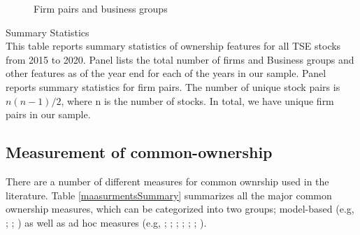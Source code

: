 	\captionsetup[subfigure]{labelformat=parens,font=footnotesize}
			\renewcommand{\thesubfigure}{\Alph{subfigure}}	
	\begin{figure}[htbp]
		\centering
		\caption{ Firm pairs and business groups}
		\label{g2-1}
		\normalcolor
	\bigskip
	
		
	\end{figure}  
	
	
	\captionsetup[subfigure]{labelformat=empty}
	
\DeclareRobustCommand{\myname}{}


	
				
		\captionsetup[subtable]{labelformat=parens}
			\renewcommand{\thesubtable}{\Alph{subtable}}
			 \begin{table}[htbp]
			 \caption{ Summary Statistics \\ \small
			 This table reports summary statistics of ownership features for all TSE stocks from 2015 to 2020. Panel  lists the total number of firms and Business groups and other features as of the year end for each of the years in our sample. Panel  reports summary statistics for firm pairs. The number of unique stock pairs is $ n(n-1)/2 $, where n is the number of stocks. In total, we have \myname unique firm pairs in our sample.  }
			\label{st1}
			\centering
			\label{t2-1}
			\resizebox{1\textwidth}{!}
			{
				
			}
			
		\centering
	\bigskip
		\label{t2-2}
		\resizebox{1\textwidth}{!}
		{
			
		}
	\end{table}
	
	\captionsetup[subtable]{labelformat=empty}

	
	
	


\FloatBarrier


\subsection{{Measurement of common-ownership}}


There are a number of different measures for common ownrship used in the literature. Table \ref{maasurmentsSummary} summarizes all the major common ownership measures, which can be categorized into two groups; model-based (e.g, \cite{harford2011institutional}; \cite{azar2018anticompetitive}; \cite{gilje2020s}) as well as ad hoc measures (e.g, \cite{AntonPolk}; \cite{azar2011new}; \cite{freeman2019effects}; \cite{hansen1996externalities};  \cite{he2017product}; \cite{lewellen2021does}; \cite{newham2018common}). 


